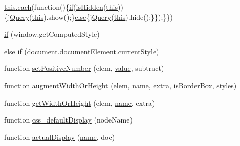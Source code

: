 \begin{DoxyCompactItemize}
\hyperlink{html_2jquery_8js_a871ff39db627c54c710a3e9909b8234c}{this.\+each}(function()\{\hyperlink{menu_2tpl_2js_2jquery_8jstree_8js_acba95bef569cfaee32c4ed0212b2bb92}{if}(\hyperlink{jquery-1_8x_8js_a67ed58d688ff11991ca2826ebfbf28a4}{is\+Hidden}(\hyperlink{jquery_8parallax-scroll_8min_8js_a05c09a5e9d53fa7adf0a7936038c2fa3}{this}))\{\hyperlink{xe__solid__enterprise__login_2js_2login_8js_a5d40f04b6bb824963a42ec4b5fbfe262}{j\+Query}(\hyperlink{jquery_8parallax-scroll_8min_8js_a05c09a5e9d53fa7adf0a7936038c2fa3}{this}).show();\}\hyperlink{swfupload_8js_a0544c3fe466e421738dae463968b70ba}{else}\{\hyperlink{xe__solid__enterprise__login_2js_2login_8js_a5d40f04b6bb824963a42ec4b5fbfe262}{j\+Query}(\hyperlink{jquery_8parallax-scroll_8min_8js_a05c09a5e9d53fa7adf0a7936038c2fa3}{this}).hide();\}\});\}\})
\item 
\hyperlink{jquery-1_8x_8js_add3620f254b483a46b557fde577ecbf7}{if} (window.\+get\+Computed\+Style)
\item 
\hyperlink{swfupload_8js_a0544c3fe466e421738dae463968b70ba}{else} \hyperlink{jquery-1_8x_8js_ac118b48e1947a1d7c85fefbdad49502e}{if} (document.\+document\+Element.\+current\+Style)
\item 
function \hyperlink{jquery-1_8x_8js_a049182834e8b4b2d7485cd919ed272d7}{set\+Positive\+Number} (elem, \hyperlink{common_2js_2jquery_8js_abe5393d870043cf6aaa1d5ad5fce755c}{value}, subtract)
\item 
function \hyperlink{jquery-1_8x_8js_aacaac1f0b5ea53030522e6f5b227ce51}{augment\+Width\+Or\+Height} (elem, \hyperlink{common_8js_a22c29d2aa8ed6161ce8faa718ef76e68}{name}, extra, is\+Border\+Box, styles)
\item 
function \hyperlink{jquery-1_8x_8js_a6520fbbeac78eeb0f519393470dc873b}{get\+Width\+Or\+Height} (elem, \hyperlink{common_8js_a22c29d2aa8ed6161ce8faa718ef76e68}{name}, extra)
\item 
function \hyperlink{jquery-1_8x_8js_a90f91be23732240774f2a323d500c78a}{css\+\_\+default\+Display} (node\+Name)
\item 
function \hyperlink{jquery-1_8x_8js_a88bc5a80e40ccc594ece17ae5772d5d3}{actual\+Display} (\hyperlink{common_8js_a22c29d2aa8ed6161ce8faa718ef76e68}{name}, doc)
\item 

\end{DoxyCompactItemize}
